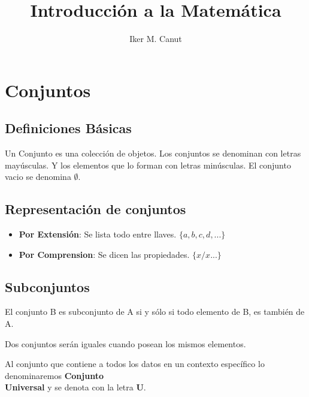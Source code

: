 \documentclass[10pt]{article}
\author{Iker M. Canut}
\begin{document}
\title{Introducción a la Matemática}
\maketitle
\date
\newpage

\tableofcontents
\newpage

\section{Conjuntos}
\subsection{Definiciones Básicas}
Un Conjunto es una colección de objetos. Los conjuntos se denominan con letras mayúsculas. Y los elementos que lo forman con letras minúsculas. El conjunto vacio se denomina $\emptyset$.
\subsection{Representación de conjuntos}
\begin{itemize}
\item \textbf{Por Extensión}: Se lista todo entre llaves. $\{a,b,c,d,...\}$
\item \textbf{Por Comprension}: Se dicen las propiedades. $\{x/x...\}$
\end{itemize}
\subsection{Subconjuntos}
El conjunto B es subconjunto de A si y sólo si todo elemento de B, es también de A.
\begin{center}
\end{center}
Dos conjuntos serán iguales cuando posean los mismos elementos.
\begin{center}
\end{center}
Al conjunto que contiene a todos los datos en un contexto específico lo denominaremos \textbf{Conjunto\\ Universal} y se denota con la letra \textbf{U}.
\end{document}
